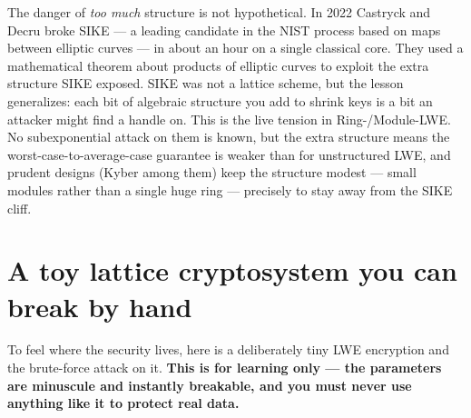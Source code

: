 \begin{attackbox}
The danger of \emph{too much} structure is not hypothetical. In 2022 Castryck and Decru broke SIKE --- a leading candidate in the NIST process based on maps between elliptic curves --- in about an hour on a single classical core. They used a mathematical theorem about products of elliptic curves to exploit the extra structure SIKE exposed. SIKE was not a lattice scheme, but the lesson generalizes: each bit of algebraic structure you add to shrink keys is a bit an attacker might find a handle on. This is the live tension in Ring-/Module-LWE. No subexponential attack on them is known, but the extra structure means the worst-case-to-average-case guarantee is weaker than for unstructured LWE, and prudent designs (Kyber among them) keep the structure modest --- small modules rather than a single huge ring --- precisely to stay away from the SIKE cliff.
\end{attackbox}

\section{A toy lattice cryptosystem you can break by hand}
\label{ch35:toy-lattice}

To feel where the security lives, here is a deliberately tiny LWE encryption and the brute-force attack on it. \textbf{This is for learning only --- the parameters are minuscule and instantly breakable, and you must never use anything like it to protect real data.}

